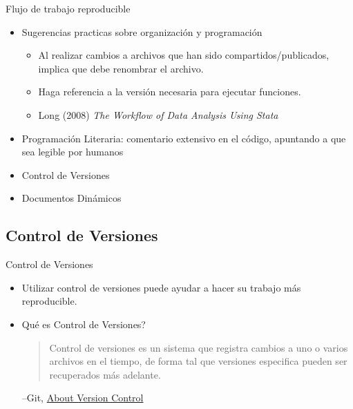 \documentclass{beamer}
\begin{document}
\begin{frame}{Flujo de trabajo reproducible}

 \begin{itemize}
 \item Sugerencias practicas sobre organización y programación
 \begin{itemize}[<.->]
 	\item Al realizar cambios a archivos que han sido compartidos/publicados, implica que debe renombrar el archivo.
 	\item Haga referencia a la versión necesaria para ejecutar funciones.
 	\item Long (2008) \textit{The Workflow of Data Analysis Using Stata}
  \end{itemize}
 \item Programación Literaria: comentario extensivo en el código, apuntando a que sea legible por humanos
 \item Control de Versiones
 \item Documentos Dinámicos
\end{itemize}
\end{frame}

\subsection*{Control de Versiones}
\begin{frame}{Control de Versiones}
\begin{itemize}[<.->]
\item
Utilizar control de versiones puede ayudar a hacer su trabajo más reproducible.

\item
Qué es Control de Versiones?

\begin{quote}
Control de versiones es un sistema que registra cambios a uno o varios archivos en el tiempo, de forma tal que versiones especifica pueden ser recuperados más adelante.
\end{quote}
--Git, \href{https://git-scm.com/book/en/v2/Getting-Started-About-Version-Control}{About Version Control}
\end{itemize}
\end{frame}
\end{document}
